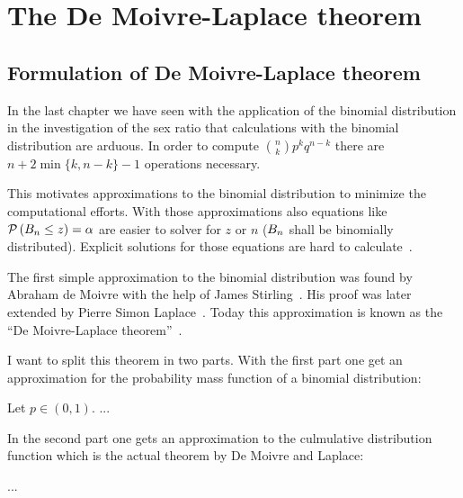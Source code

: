 \chapter{The De Moivre-Laplace theorem}

\section{Formulation of De Moivre-Laplace theorem}


In the last chapter we have seen with the application of the binomial distribution in the investigation of the sex ratio that calculations with the binomial distribution are arduous. In order to compute $\binom nk p^kq^{n-k}$ there are $n+2\min\{k,n-k\}-1$ operations necessary.

This motivates approximations to the binomial distribution to minimize the computational efforts. With those approximations also equations like $\mathcal P\left({B_{n} \le z}\right)=\alpha$ are easier to solver for $z$ or $n$ ($B_{n}$ shall be binomially distributed). Explicit solutions for those equations are hard to calculate~\cite[p. 469]{hald1}.

The first simple approximation to the binomial distribution was found by Abraham de Moivre with the help of James Stirling~\cite[p. 469]{hald1}. His proof was later extended by Pierre Simon Laplace~\cite[pp. 495 ff.]{hald1}. Today this approximation is known as the ``De Moivre-Laplace theorem''~\cite[pp. 64-67]{irle}. 

I want to split this theorem in two parts. With the first part one get an approximation for the probability mass function of a binomial distribution:

\begin{theorem}
  Let $p\in(0,1)$. ...
\end{theorem}

In the second part one gets an approximation to the culmulative distribution function which is the actual theorem by De Moivre and Laplace:

\begin{theorem}
  ...
\end{theorem}

